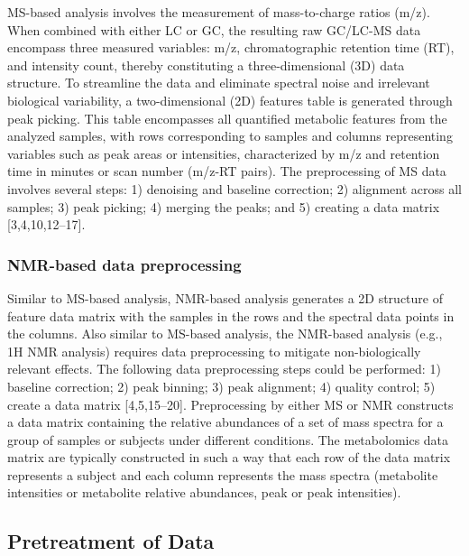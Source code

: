 \documentclass[ENG, BIB]{TFUOC}%
\begin{document}
MS-based analysis involves the measurement of mass-to-charge ratios (m/z). When combined with either LC or GC, the resulting raw GC/LC-MS data encompass three measured variables: m/z, chromatographic retention time (RT), and intensity count, thereby constituting a three-dimensional (3D) data structure.
To streamline the data and eliminate spectral noise and irrelevant biological variability, a two-dimensional (2D) features table is generated through peak picking. This table encompasses all quantified metabolic features from the analyzed samples, with rows corresponding to samples and columns representing variables such as peak areas or intensities, characterized by m/z and retention time in minutes or scan number (m/z-RT pairs).
The preprocessing of MS data involves several steps: 1) denoising and baseline correction; 2) alignment across all samples; 3) peak picking; 4) merging the peaks; and 5) creating a data matrix [3,4,10,12–17].


\subsubsection{NMR-based data preprocessing}
Similar to MS-based analysis, NMR-based analysis generates a 2D structure of feature data matrix with the samples in the rows and the spectral data points in the columns. Also similar to MS-based analysis, the NMR-based analysis (e.g., 1H NMR analysis) requires data preprocessing to mitigate non-biologically relevant effects. The following data preprocessing steps could be performed: 1) baseline correction; 2) peak binning; 3) peak alignment; 4) quality control; 5) create a data matrix [4,5,15–20].
Preprocessing by either MS or NMR constructs a data matrix containing the relative abundances of a set of mass spectra for a group of samples or subjects under different conditions. The metabolomics data matrix are typically constructed in such a way that each row of the data matrix represents a subject and each column represents the mass spectra (metabolite intensities or metabolite relative abundances, peak or peak intensities).


\subsection{Pretreatment of Data}
\end{document}
